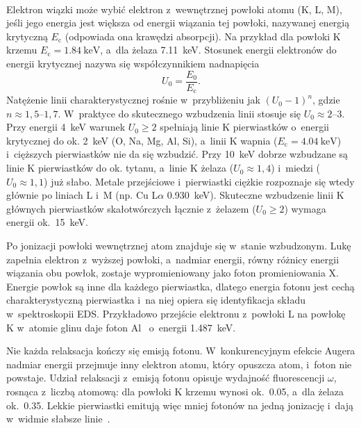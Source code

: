 \paragraph{}
\label{subsec:jonizacja}
Elektron wiązki może wybić elektron z~wewnętrznej powłoki atomu (K, L,
M), jeśli jego energia jest większa od energii wiązania tej powłoki,
nazywanej energią krytyczną $E_\mathrm{c}$ (odpowiada ona krawędzi
absorpcji). Na przykład dla powłoki K krzemu
$E_\mathrm{c}=\SI{1.84}{\kilo\electronvolt}$, a~dla żelaza
\SI{7.11}{\kilo\electronvolt}. Stosunek energii elektronów do energii
krytycznej nazywa się współczynnikiem nadnapięcia
\begin{equation}
  U_0 = \frac{E_0}{E_\mathrm{c}}.
\end{equation}
Natężenie linii charakterystycznej rośnie w~przybliżeniu jak
$(U_0-1)^{n}$, gdzie $n\approx1{,}5$--$1{,}7$. W~praktyce do skutecznego
wzbudzenia linii stosuje się $U_0\approx2$--3. Przy energii
\SI{4}{\kilo\electronvolt} warunek $U_0\geq2$ spełniają linie K
pierwiastków o~energii krytycznej do ok. \SI{2}{\kilo\electronvolt}
(O, Na, Mg, Al, Si), a~linii K wapnia ($E_\mathrm{c}=\SI{4.04}{\kilo\electronvolt}$)
i~cięższych pierwiastków nie da się wzbudzić. Przy \SI{10}{\kilo\electronvolt}
dobrze wzbudzane są linie K pierwiastków do ok. tytanu, a~linie K żelaza
($U_0\approx1{,}4$) i~miedzi ($U_0\approx1{,}1$) już słabo. Metale
przejściowe i~pierwiastki ciężkie rozpoznaje się wtedy głównie po liniach
L i~M (np. Cu L$\alpha$ \SI{0.930}{\kilo\electronvolt}). Skuteczne
wzbudzenie linii K głównych pierwiastków skałotwórczych łącznie
z~żelazem ($U_0 \geq 2$) wymaga energii ok.~\SI{15}{\kilo\electronvolt}.

Po jonizacji powłoki wewnętrznej atom znajduje się w~stanie wzbudzonym.
Lukę zapełnia elektron z~wyższej powłoki, a~nadmiar energii, równy
różnicy energii wiązania obu powłok, zostaje wypromieniowany jako foton
promieniowania X. Energie powłok są inne dla każdego pierwiastka, dlatego
energia fotonu jest cechą charakterystyczną pierwiastka i~na niej opiera
się identyfikacja składu w~spektroskopii EDS. Przykładowo przejście
elektronu z~powłoki L na powłokę K w~atomie glinu daje foton Al~\Ka{}
o~energii \SI{1.487}{\kilo\electronvolt}.

Nie każda relaksacja kończy się emisją fotonu. W~konkurencyjnym efekcie
Augera nadmiar energii przejmuje inny elektron atomu, który opuszcza atom,
i~foton nie powstaje. Udział relaksacji z~emisją fotonu opisuje wydajność
fluorescencji $\omega$, rosnąca z~liczbą atomową: dla powłoki K krzemu
wynosi ok.~\num{0.05}, a~dla żelaza ok.~\num{0.35}. Lekkie pierwiastki
emitują więc mniej fotonów na jedną jonizację i~dają w~widmie słabsze
linie~\cite{goldstein2018sem,beckhoff2006xrf}.

